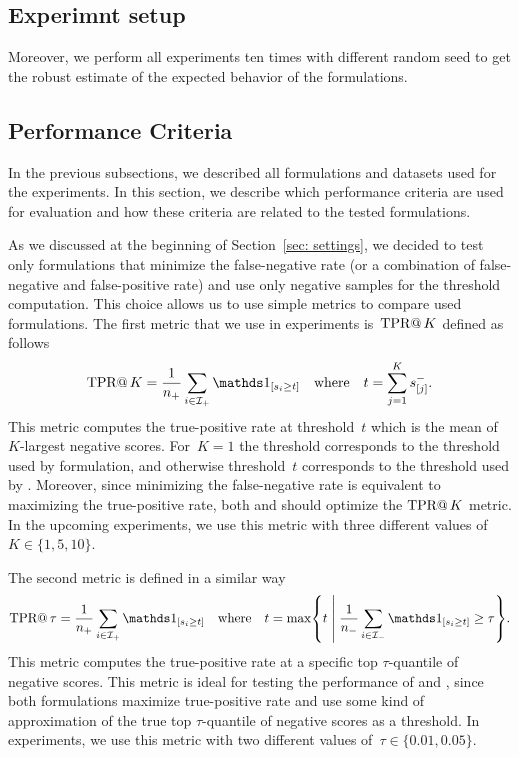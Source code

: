 \subsection{Experimnt setup}\label{subsec: exp setup}

Moreover, we perform all experiments ten times with different random seed to get the robust estimate of the expected behavior of the formulations.

\subsection{Performance Criteria}\label{sec: performance criteria}

In the previous subsections, we described all formulations and datasets used for the experiments. In this section, we describe which performance criteria are used for evaluation and how these criteria are related to the tested formulations.

As we discussed at the beginning of Section~\ref{sec: settings}, we decided to test only formulations that minimize the false-negative rate (or a combination of false-negative and false-positive rate) and use only negative samples for the threshold computation. This choice allows us to use simple metrics to compare used formulations. The first metric that we use in experiments is~$\operatorname{TPR@}K$ defined as follows
\begin{equation*}
  \tpratk = \frac{1}{\npos} \sum_{i \in \Ipos} \Iverson{s_i \geq t} \quad \text{where} \quad t = \sum_{j = 1}^{K} s^{-}_{[j]}.
\end{equation*}
This metric computes the true-positive rate at threshold~$t$ which is the mean of $K$-largest negative scores. For~$K = 1$ the threshold corresponds to the threshold used by \TopPush formulation, and otherwise threshold~$t$ corresponds to the threshold used by \TopPushK. Moreover, since minimizing the false-negative rate is equivalent to maximizing the true-positive rate, both \TopPush and \TopPushK should optimize the $\operatorname{TPR@}K$ metric. In the upcoming experiments, we use this metric with three different values of~$K \in \{1, 5, 10\}.$

The second metric is defined in a similar way
\begin{equation*}
  \tpratfpr = \frac{1}{\npos} \sum_{i \in \Ipos} \Iverson{s_i \geq t} \quad \text{where} \quad t
  = \max \Set{t}{\frac{1}{\nneg} \sum_{i \in \Ineg} \Iverson{s_i \geq t} \geq \tau}.
\end{equation*}
This metric computes the true-positive rate at a specific top $\tau$-quantile of negative scores. This metric is ideal for testing the performance of \tauFPL and \PatMatNP, since both formulations maximize true-positive rate and use some kind of approximation of the true top $\tau$-quantile of negative scores as a threshold. In experiments, we use this metric with two different values of~$\tau \in \{0.01, 0.05\}.$ 


